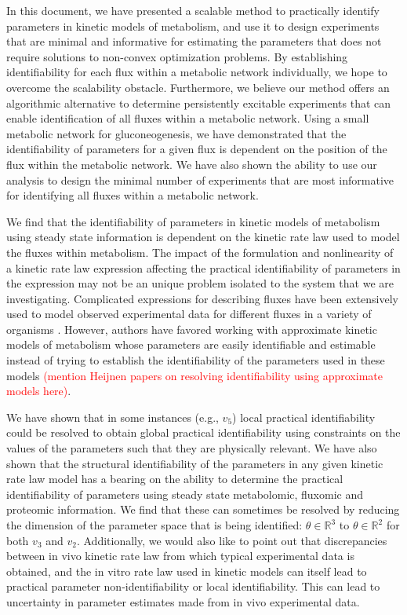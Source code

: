 \documentclass[10pt]{article}
\begin{document}
	In this document, we have presented a scalable method to practically identify parameters in kinetic models of metabolism, and use it to design experiments that are minimal and informative for estimating the parameters that does not require solutions to non-convex optimization problems. By establishing identifiability for each flux within a metabolic network individually, we hope to overcome the scalability obstacle. Furthermore, we believe our method offers an algorithmic alternative to determine persistently excitable experiments that can enable identification of all fluxes within a metabolic network. Using a small metabolic network for gluconeogenesis, we have demonstrated that the identifiability of parameters for a given flux is dependent on the position of the flux within the metabolic network. We have also shown the ability to use our analysis to design the minimal number of experiments that are most informative for identifying all fluxes within a metabolic network.
	
	We find that the identifiability of parameters in kinetic models of metabolism using steady state information is dependent on the kinetic rate law used to model the fluxes within metabolism. The impact of the formulation and nonlinearity of a kinetic rate law expression affecting the practical identifiability of parameters in the expression may not be an unique problem isolated to the system that we are investigating. Complicated expressions for describing fluxes have been extensively used to model observed experimental data for different fluxes in a variety of organisms \parencite{Chassagnole2002a, Peskov2012, VanHeerden2014}. However, authors have favored working with approximate kinetic models of metabolism whose parameters are easily identifiable and estimable instead of trying to establish the identifiability of the parameters used in these models \textcolor{red}{(mention Heijnen papers on resolving identifiability using approximate models here)}.	
	
	We have shown that in some instances (e.g., $v_5$) local practical identifiability could be resolved to obtain global practical identifiability using constraints on the values of the parameters such that they are physically relevant. We have also shown that the structural identifiability of the parameters in any given kinetic rate law model has a bearing on the ability to determine the practical identifiability of parameters using steady state metabolomic, fluxomic and proteomic information. We find that these can sometimes be resolved by reducing the dimension of the parameter space that is being identified: $\theta \in \mathbb{R}^3$ to $\theta \in \mathbb{R}^2$ for both $v_3$ and $v_2$. Additionally, we would also like to point out that discrepancies between in vivo kinetic rate law from which typical experimental data is obtained, and the in vitro rate law used in kinetic models can itself lead to practical parameter non-identifiability or local identifiability. This can lead to uncertainty in parameter estimates made from in vivo experimental data.
	
\end{document}
